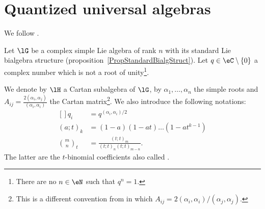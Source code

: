 \section{Quantized universal algebras}

We follow \cite{SoibelmanI}.

Let \( \lG\) be a complex simple Lie algebra of rank \( n\) with its standard Lie bialgebra structure (proposition~\ref{PropStandardBialgStruct}). Let \( q\in\eC\setminus\{ 0 \}\) a complex number which is not a root of unity\footnote{There are no \( n\in\eN\) such that \( q^n=1\).}.

We denote by \( \lH\) a Cartan subalgebra of \( \lG \), by \( \alpha_1,\ldots,\alpha_n\) the simple roots and \( A_{ij}=\frac{ 2(\alpha_i,\alpha_j) }{ (\alpha_i,\alpha_i) }\) the Cartan matrix\footnote{This is a different convention from \cite{SoibelmanI} in which \( A_{ij}=2(\alpha_i,\alpha_i)/(\alpha_j,\alpha_j)\).}. We also introduce the following notations:
\begin{equation}
	\begin{aligned}[]
		q_i            & =q^{(\alpha_i,\alpha_i)/2}               \\
		(a;t)_k        & =(1-a)(1-at)\ldots (1-at^{k-1})          \\
		\binom{m}{n}_t & =\frac{ (t;t)_m }{ (t;t)_n(t;t)_{m-n} }.
	\end{aligned}
\end{equation}
The latter are the \( t\)-binomial coefficients also called .

